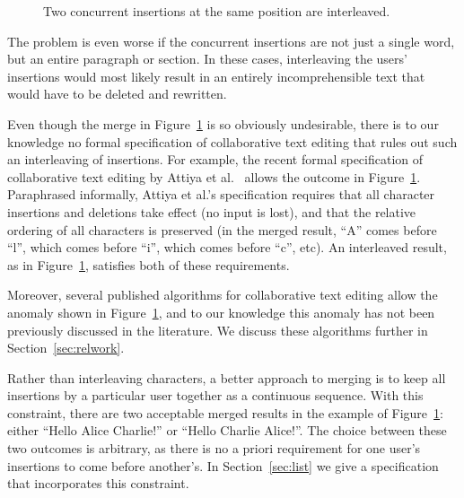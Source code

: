 \begin{figure}
\centering
{}
\caption{Two concurrent insertions at the same position are interleaved.}\label{fig:bad-merge}
\end{figure}

The problem is even worse if the concurrent insertions are not just a single word, but an entire paragraph or section.
In these cases, interleaving the users' insertions would most likely result in an entirely incomprehensible text that would have to be deleted and rewritten.

Even though the merge in Figure~\ref{fig:bad-merge} is so obviously undesirable, there is to our knowledge no formal specification of collaborative text editing that rules out such an interleaving of insertions.
For example, the recent formal specification of collaborative text editing by Attiya et al.~\cite{Attiya:2016kh} allows the outcome in Figure~\ref{fig:bad-merge}.
Paraphrased informally, Attiya et al.'s specification requires that all character insertions and deletions take effect (no input is lost), and that the relative ordering of all characters is preserved (in the merged result, ``A'' comes before ``l'', which comes before ``i'', which comes before ``c'', etc).
An interleaved result, as in Figure~\ref{fig:bad-merge}, satisfies both of these requirements.

Moreover, several published algorithms for collaborative text editing allow the anomaly shown in Figure~\ref{fig:bad-merge}, and to our knowledge this anomaly has not been previously discussed in the literature.
We discuss these algorithms further in Section~\ref{sec:relwork}.

Rather than interleaving characters, a better approach to merging is to keep all insertions by a particular user together as a continuous sequence.
With this constraint, there are two acceptable merged results in the example of Figure~\ref{fig:bad-merge}: either ``Hello Alice Charlie!'' or ``Hello Charlie Alice!''.
The choice between these two outcomes is arbitrary, as there is no a priori requirement for one user's insertions to come before another's.
In Section~\ref{sec:list} we give a specification that incorporates this constraint.
